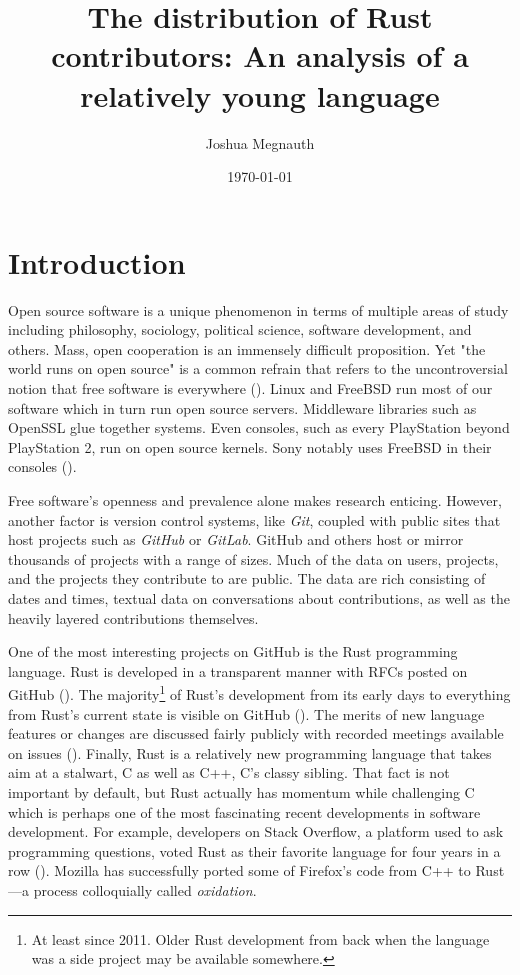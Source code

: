 \documentclass[12pt, a4paper]{article}
\title{The distribution of Rust contributors: An analysis of a relatively young language}
\author{Joshua Megnauth}
\date{\today}
\begin{document}
\maketitle

\section{Introduction}
Open source software is a unique phenomenon in terms of multiple areas of study including philosophy, sociology, political science, software development, and others. Mass, open cooperation is an immensely difficult proposition. Yet "the world runs on open source" is a common refrain that refers to the uncontroversial notion that free software is everywhere (\cite{fossdatasci2020}). Linux and FreeBSD run most of our software which in turn run open source servers. Middleware libraries such as OpenSSL glue together systems. Even consoles, such as every PlayStation beyond PlayStation 2, run on open source kernels. Sony notably uses FreeBSD in their consoles (\cite{ps4freebsd}).

Free software's openness and prevalence alone makes research enticing. However, another factor is version control systems, like \textit{Git}, coupled with public sites that host projects such as \textit{GitHub} or \textit{GitLab}. GitHub and others host or mirror thousands of projects with a range of sizes. Much of the data on users, projects, and the projects they contribute to are public. The data are rich consisting of dates and times, textual data on conversations about contributions, as well as the heavily layered contributions themselves.

One of the most interesting projects on GitHub is the Rust programming language. Rust is developed in a transparent manner with RFCs posted on GitHub (\cite{rustrfcs}). The majority\footnote{At least since 2011. Older Rust development from back when the language was a side project may be available somewhere.} of Rust's development from its early days to everything from Rust's current state is visible on GitHub (\cite{rustlang}). The merits of new language features or changes are discussed fairly publicly with recorded meetings available on issues (\cite{rustteammeets}). Finally, Rust is a relatively new programming language that takes aim at a stalwart, C as well as C++, C's classy sibling. That fact is not important by default, but Rust actually has momentum while challenging C which is perhaps one of the most fascinating recent developments in software development. For example, developers on Stack Overflow, a platform used to ask programming questions, voted Rust as their favorite language for four years in a row (\cite{stackoverflowdevsurvey2020}). Mozilla has successfully ported some of Firefox's code from C++ to Rust---a process colloquially called \textit{oxidation}.
\end{document}
